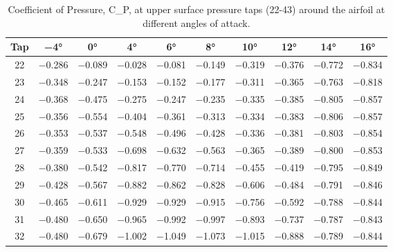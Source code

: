 \begin{table}[htpb]
    \caption{Coefficient of Pressure, \gls{C_P}, at upper surface pressure taps (22-43) around the airfoil at different angles of attack.}
    \label{tab:C_P_upper_data}
    \centering
    \begin{tabular}{cccccccccc}
        \toprule
        Tap & \num{-4}\unit{\degree} & \num{0}\unit{\degree} & \num{4}\unit{\degree} & \num{6}\unit{\degree} & \num{8}\unit{\degree} & \num{10}\unit{\degree} & \num{12}\unit{\degree} & \num{14}\unit{\degree} & \num{16}\unit{\degree} \\
        \midrule
\num{22} & \num{-0.286} & \num{-0.089} & \num{-0.028} & \num{-0.081} & \num{-0.149} & \num{-0.319} & \num{-0.376} & \num{-0.772} & \num{-0.834} \\
\num{23} & \num{-0.348} & \num{-0.247} & \num{-0.153} & \num{-0.152} & \num{-0.177} & \num{-0.311} & \num{-0.365} & \num{-0.763} & \num{-0.818} \\
\num{24} & \num{-0.368} & \num{-0.475} & \num{-0.275} & \num{-0.247} & \num{-0.235} & \num{-0.335} & \num{-0.385} & \num{-0.805} & \num{-0.857} \\
\num{25} & \num{-0.356} & \num{-0.554} & \num{-0.404} & \num{-0.361} & \num{-0.313} & \num{-0.334} & \num{-0.383} & \num{-0.806} & \num{-0.857} \\
\num{26} & \num{-0.353} & \num{-0.537} & \num{-0.548} & \num{-0.496} & \num{-0.428} & \num{-0.336} & \num{-0.381} & \num{-0.803} & \num{-0.854} \\
\num{27} & \num{-0.359} & \num{-0.533} & \num{-0.698} & \num{-0.632} & \num{-0.563} & \num{-0.365} & \num{-0.389} & \num{-0.800} & \num{-0.853} \\
\num{28} & \num{-0.380} & \num{-0.542} & \num{-0.817} & \num{-0.770} & \num{-0.714} & \num{-0.455} & \num{-0.419} & \num{-0.795} & \num{-0.849} \\
\num{29} & \num{-0.428} & \num{-0.567} & \num{-0.882} & \num{-0.862} & \num{-0.828} & \num{-0.606} & \num{-0.484} & \num{-0.791} & \num{-0.846} \\
\num{30} & \num{-0.465} & \num{-0.611} & \num{-0.929} & \num{-0.929} & \num{-0.915} & \num{-0.756} & \num{-0.592} & \num{-0.788} & \num{-0.844} \\
\num{31} & \num{-0.480} & \num{-0.650} & \num{-0.965} & \num{-0.992} & \num{-0.997} & \num{-0.893} & \num{-0.737} & \num{-0.787} & \num{-0.843} \\
\num{32} & \num{-0.480} & \num{-0.679} & \num{-1.002} & \num{-1.049} & \num{-1.073} & \num{-1.015} & \num{-0.888} & \num{-0.789} & \num{-0.844} \\

\end{tabular}
\end{table}

